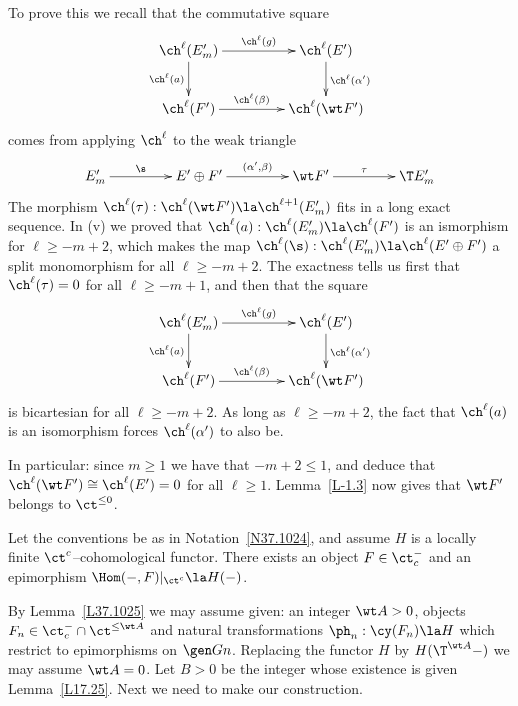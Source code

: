 \documentclass[11pt]{amsart}
\begin{document}
To prove this we recall that the commutative square
\[\xymatrix@C+20pt{
  \ch^\ell(E'_m) \ar[r]^-{\ch^\ell(g)}\ar[d]_-{\ch^\ell(a)} & \ch^\ell(E')\ar[d]^{\ch^\ell(\alpha')} \\
\ch^\ell(F')\ar[r]^-{\ch^\ell(\beta)} & \ch^\ell(\wt F')
}\] 
comes from applying $\ch^\ell$ to the weak triangle 
\[\xymatrix@C+20pt{
  E'_m \ar[r]^-{\s} & E'\oplus F' \ar[r]^-{(\alpha',\beta)} &\wt F'
  \ar[r]^-{\tau} &\T E'_m
}\]
The morphism
$\ch^\ell(\tau):\ch^\ell(\wt F')\la \ch^{\ell+1}(E'_m)$
fits in a long exact sequence. In (v) we proved that
$\ch^\ell(a):\ch^\ell(E'_m)\la\ch^\ell(F')$
is an ismorphism for $\ell\geq-m+2$, which makes the map
$\ch^\ell(\s):\ch^\ell(E'_m) \la \ch^\ell(E'\oplus F')$ a split
monomorphism for all $\ell\geq-m+2$. The exactness
tells us first that $\ch^\ell(\tau)=0$ for all
$\ell\geq-m+1$, and then that the
square
\[\xymatrix@C+20pt{
  \ch^\ell(E'_m) \ar[r]^-{\ch^\ell(g)}\ar[d]_-{\ch^\ell(a)} & \ch^\ell(E')\ar[d]^{\ch^\ell(\alpha')} \\
\ch^\ell(F')\ar[r]^-{\ch^\ell(\beta)} & \ch^\ell(\wt F')
}\] 
is bicartesian
for all $\ell\geq-m+2$. As long as $\ell\geq-m+2$,
the fact that $\ch^\ell(a)$
is an isomorphism forces $\ch^\ell(\alpha')$ to also be.

In particular: since $m\geq1$ we have that $-m+2\leq1$, and deduce that
$\ch^\ell(\wt F')\cong\ch^\ell(E')=0$ for all $\ell\geq1$.
Lemma~\ref{L-1.3} now gives that $\wt F'$ belongs to $\ct^{\leq0}$.
\eprf

Let the conventions be as in Notation~\ref{N37.1024}, 
and assume
$H$ is a locally finite $\ct^c$--cohomological functor.
There exists an object $F\in\ct^-_c$ and an
epimorphism $\Hom(-,F)|_{\ct^c}\la H(-)$.
\elem

\prf
By Lemma~\ref{L37.1025} we may assume given:
an integer $\wt A>0$, objects $F_n\in\ct^-_c\cap\ct^{\leq\wt A}$ and
natural transformations $\ph_n:\cy(F_n)\la H$
which restrict to epimorphisms on $\gen Gn$. Replacing the functor
$H$ by $H(\T^{\wt A}-)$ we may assume $\wt A=0$. Let $B>0$ be
the integer whose existence is given
Lemma~\ref{L17.25}.
Next we need to make our construction.
\end{document}
